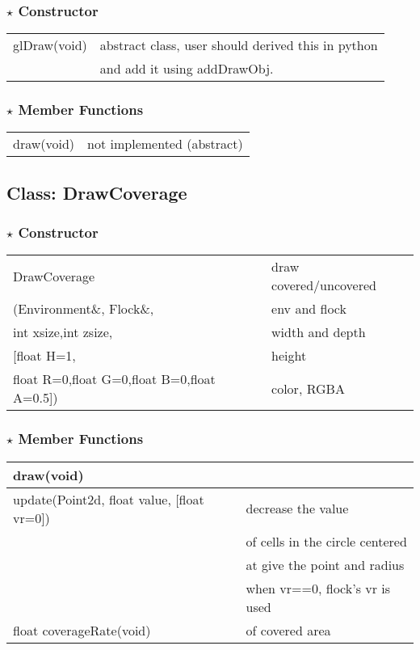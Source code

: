 \documentclass[onecolumn,10pt]{article}
\begin{document}
\subsubsection*{$\star$ Constructor}
\begin{tabular}{l|l}
glDraw(void)    & abstract class, user should derived this in python \\
             & and add it using addDrawObj.
\end{tabular}

\subsubsection*{$\star$ Member Functions}

\begin{tabular}{l|l}
draw(void)     & not implemented (abstract)
\end{tabular}

\subsection{Class: DrawCoverage}

\subsubsection*{$\star$ Constructor}
\begin{tabular}{l|l}
DrawCoverage                                   & draw covered/uncovered\\
(Environment\&, Flock\&,                           & env and flock\\
 int xsize,int zsize,                          & width and depth \\
 {[}float H=1,                                   & height \\
  float R=0,float G=0,float B=0,float A=0.5{]}) & color, RGBA \\
\end{tabular}
	 
\subsubsection*{$\star$ Member Functions}

\begin{tabular}{l|l}
draw(void)           & \\\hline
update(Point2d, float value, [float vr=0]) & decrease the value \\
                                            & of cells in the circle centered \\
                                            & at give the point and radius \\
					    & when vr==0, flock's vr is used \\\hline
float coverageRate(void)    & of covered area \\
\end{tabular}
\end{document}
